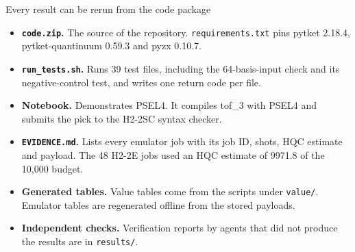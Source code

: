 \documentclass[aspectratio=169,11pt]{beamer}
\newcommand{\code}[1]{\texttt{#1}}
\begin{document}
\begin{frame}{Every result can be rerun from the code package}
  \small
  \begin{itemize}\setlength{\itemsep}{4pt}
    \item \textbf{\code{code.zip}.} The source of the repository. \code{requirements.txt} pins pytket 2.18.4, pytket-quantinuum 0.59.3 and pyzx 0.10.7.
    \item \textbf{\code{run\_tests.sh}.} Runs 39 test files, including the 64-basis-input check and its negative-control test, and writes one return code per file.
    \item \textbf{Notebook.} Demonstrates PSEL4. It compiles tof\_3 with PSEL4 and submits the pick to the H2-2SC syntax checker.
    \item \textbf{\code{EVIDENCE.md}.} Lists every emulator job with its job ID, shots, HQC estimate and payload. The 48 H2-2E jobs used an HQC estimate of 9971.8 of the 10,000 budget.
    \item \textbf{Generated tables.} Value tables come from the scripts under \code{value/}. Emulator tables are regenerated offline from the stored payloads.
    \item \textbf{Independent checks.} Verification reports by agents that did not produce the results are in \code{results/}.
  \end{itemize}
\end{frame}
\end{document}
